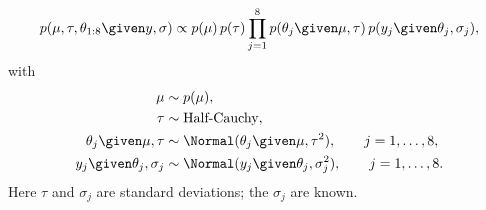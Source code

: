 \begin{align*}
p(\mu, \tau, \theta_{1:8} \given y, \sigma) \propto p(\mu)\,p(\tau)\prod_{j=1}^{8}p(\theta_j \given \mu, \tau)\,p(y_j \given \theta_j, \sigma_j),
\end{align*}
with
\begin{align*}
\mu &\sim p(\mu), \\
\tau &\sim \text{Half-Cauchy}, \\
\theta_j \given \mu, \tau &\sim \Normal(\theta_j \given \mu, \tau^2), \qquad j = 1, \dots, 8, \\
y_j \given \theta_j, \sigma_j &\sim \Normal(y_j \given \theta_j, \sigma_j^2), \qquad j = 1, \dots, 8.
\end{align*}
Here $\tau$ and $\sigma_j$ are standard deviations; the $\sigma_j$ are known.


